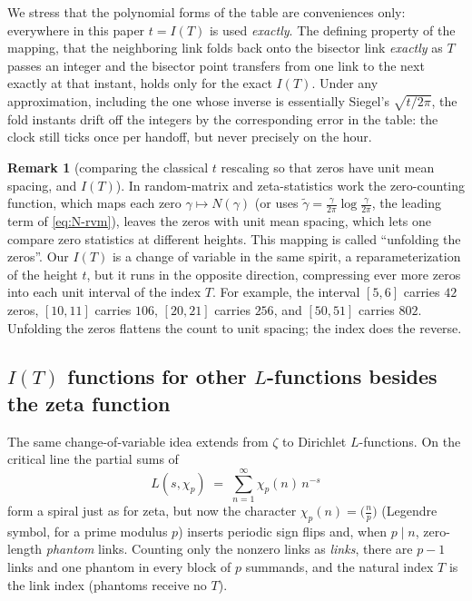 \documentclass[11pt]{article}
\theoremstyle{definition}
\newtheorem{remark}[theorem]{Remark}
\begin{document}
We stress that the polynomial forms of the table are conveniences only:
everywhere in this paper $t=I(T)$ is used \emph{exactly}. The defining
property of the mapping, that the neighboring link folds back onto the
bisector link \emph{exactly} as $T$ passes an integer and the bisector
point transfers from one link to the next exactly at that instant,
holds only for the exact $I(T)$. Under any approximation, including the one whose
inverse is essentially Siegel's $\sqrt{t/2\pi}$, the fold instants drift
off the integers by the corresponding error in the table: the clock
still ticks once per handoff, but never precisely on the hour.

\begin{remark}[comparing the classical $t$ rescaling so that zeros have unit
mean spacing, and $I(T)$]\label{rem:unfolding}
In random-matrix and zeta-statistics work the zero-counting function, which
maps each zero $\gamma\mapsto N(\gamma)$ (or uses
$\tilde\gamma=\frac{\gamma}{2\pi}\log\frac{\gamma}{2\pi}$, the leading term of
\eqref{eq:N-rvm}), leaves the zeros with unit mean spacing, which lets
one compare zero statistics at different heights. This mapping is called
``unfolding the zeros''. Our $I(T)$ is a change of
variable in the same spirit, a reparameterization of the height $t$, but it
runs in the opposite direction, compressing ever more zeros into each unit
interval of the index $T$. For example, the interval $[5,6]$ carries $42$
zeros, $[10,11]$ carries $106$, $[20,21]$ carries $256$, and $[50,51]$ carries
$802$. Unfolding the zeros flattens the count to unit spacing; the index does
the reverse.
\end{remark}

\subsection{\texorpdfstring{$I(T)$}{I(T)} functions for other \texorpdfstring{$L$}{L}-functions besides the zeta function}\label{sec:IT-Lfunctions}

The same change-of-variable idea extends from $\zeta$ to Dirichlet
$L$-functions. On the critical line the partial sums of
\begin{equation}\label{eq:Lchi}
L(s,\chi_p)
\;=\;
\sum_{n=1}^{\infty}\chi_p(n)\,n^{-s}
\end{equation}
form a spiral just as for zeta, but now the character
$\chi_p(n)=\bigl(\tfrac{n}{p}\bigr)$ (Legendre symbol, for a prime modulus
$p$) inserts periodic sign flips and, when $p\mid n$, zero-length
\emph{phantom} links. Counting only the nonzero links as \emph{links},
there are $p-1$ links and one phantom in every block of $p$ summands, and
the natural index $T$ is the link index (phantoms receive no $T$).
\end{document}
